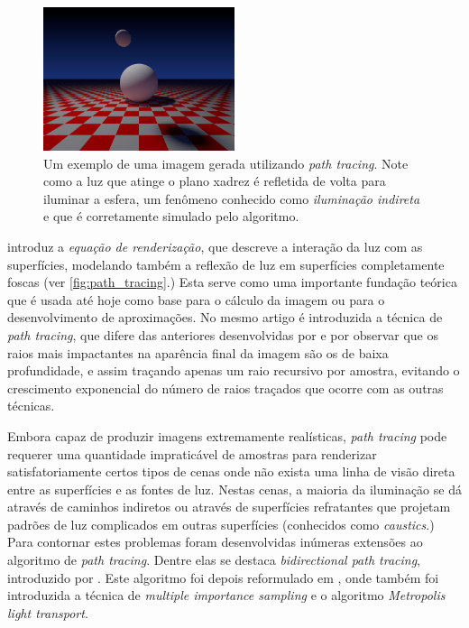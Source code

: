 \documentclass[tg]{mdtufsm}
\begin{document}
\begin{figure}
	\centering
	\includegraphics[width=0.5\textwidth]{exemplo_imagem}
	\caption[Um exemplo de uma imagem gerada utilizando \emph{path tracing}.]{
		Um exemplo de uma imagem gerada utilizando \emph{path tracing}. Note como a luz que atinge o
		plano xadrez é refletida de volta para iluminar a esfera, um fenômeno conhecido como
		\emph{iluminação indireta} e que é corretamente simulado pelo algoritmo.
	}
	\label{fig:path_tracing}
\end{figure}

 introduz a \emph{equação de renderização}, que descreve a interação da luz com as
superfícies, modelando também a reflexão de luz em superfícies completamente foscas (ver
\autoref{fig:path_tracing}.) Esta serve como uma importante fundação teórica que é usada até hoje
como base
para o cálculo da imagem ou para o desenvolvimento de aproximações. No mesmo artigo é introduzida a
técnica de \emph{path tracing}, que difere das anteriores desenvolvidas por \citeauthor{cook1984} e
\citeauthor{whitted1980} por observar que os raios mais impactantes na aparência final da imagem são
os de baixa profundidade, e assim traçando apenas um raio recursivo por amostra, evitando o
crescimento exponencial do número de raios traçados que ocorre com as outras técnicas.

Embora capaz de produzir imagens extremamente realísticas, \emph{path tracing} pode requerer uma
quantidade impraticável de amostras para renderizar satisfatoriamente certos tipos de cenas onde não
exista uma linha de visão direta entre as superfícies e as fontes de luz. Nestas cenas, a maioria da
iluminação se dá através de caminhos indiretos ou através de superfícies refratantes que projetam
padrões de luz complicados em outras superfícies (conhecidos como \emph{caustics}.) Para contornar
estes problemas foram desenvolvidas inúmeras extensões ao algoritmo de \emph{path tracing}. Dentre
elas se destaca \emph{bidirectional path tracing}, introduzido por \citet{lafortune1993}. Este
algoritmo foi depois reformulado em \citep{veach1997}, onde também foi introduzida a técnica de
\emph{multiple importance sampling} e o algoritmo \emph{Metropolis light transport}.
\end{document}
